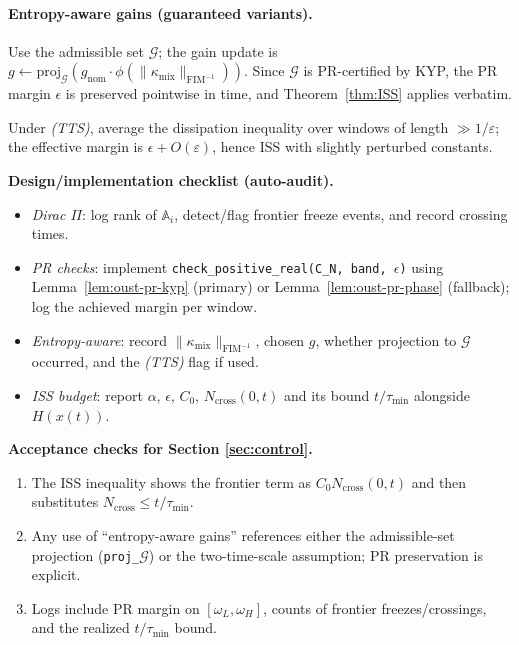 \documentclass[10pt]{article}
\newcommand{\FIM}{\mathrm{FIM}}
\begin{document}
\paragraph{Entropy-aware gains (guaranteed variants).}
\begin{description}[leftmargin=*,style=nextline]
\item[Projection policy (preferred).] Use the admissible set $\mathcal G$; the gain update is $g\leftarrow\mathrm{proj}_{\mathcal G}(g_{\mathrm{nom}}\cdot \phi(\|\kappa_{\mathrm{mix}}\|_{\FIM^{-1}}))$. Since $\mathcal G$ is PR-certified by KYP, the PR margin $\epsilon$ is preserved pointwise in time, and Theorem~\ref{thm:ISS} applies verbatim.
\item[Two-time-scale policy.] Under \emph{(TTS)}, average the dissipation inequality over windows of length $\gg 1/\varepsilon$; the effective margin is $\epsilon+O(\varepsilon)$, hence ISS with slightly perturbed constants.
\end{description}

\begin{mdframed}
\textbf{Design/implementation checklist (auto-audit).}
\begin{itemize}[leftmargin=*]
\item \emph{Dirac $\Pi$}: log rank of $\mathbb A_i$, detect/flag frontier freeze events, and record crossing times.
\item \emph{PR checks}: implement \texttt{check\_positive\_real(C\_N, band, $\epsilon$)} using Lemma~\ref{lem:oust-pr-kyp} (primary) or Lemma~\ref{lem:oust-pr-phase} (fallback); log the achieved margin per window.
\item \emph{Entropy-aware}: record $\|\kappa_{\mathrm{mix}}\|_{\FIM^{-1}}$, chosen $g$, whether projection to $\mathcal G$ occurred, and the \emph{(TTS)} flag if used.
\item \emph{ISS budget}: report $\alpha$, $\epsilon$, $C_0$, $N_{\mathrm{cross}}(0,t)$ and its bound $t/\tau_{\min}$ alongside $H(x(t))$.
\end{itemize}
\end{mdframed}

\begin{mdframed}
\textbf{Acceptance checks for Section \ref{sec:control}.}
\begin{enumerate}[leftmargin=*]
\item The ISS inequality shows the frontier term as $C_0 N_{\mathrm{cross}}(0,t)$ and then substitutes $N_{\mathrm{cross}}\le t/\tau_{\min}$.
\item Any use of “entropy-aware gains” references either the admissible-set projection (\texttt{proj\_}\(\mathcal G\)) or the two-time-scale assumption; PR preservation is explicit.
\item Logs include PR margin on $[\omega_L,\omega_H]$, counts of frontier freezes/crossings, and the realized $t/\tau_{\min}$ bound.
\end{enumerate}
\end{mdframed}
\end{document}
